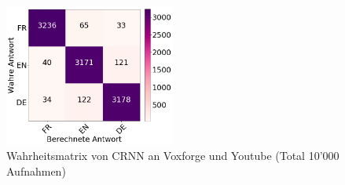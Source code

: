  \begin{figure}[hbt]
	\centering
		\includegraphics[width=0.5\textwidth]{assets/matrix_voxyou_crnn.png}
	\caption{Wahrheitsmatrix von CRNN an Voxforge und Youtube (Total 10'000 Aufnahmen)}
	\label{img:matrix_vox}
\end{figure}

